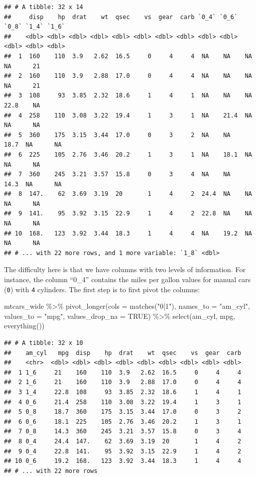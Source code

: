 \documentclass[
]{article}
\newenvironment{Shaded}{\begin{snugshade}}{\end{snugshade}}
\newcommand{\AttributeTok}[1]{\textcolor[rgb]{0.77,0.63,0.00}{#1}}
\newcommand{\ConstantTok}[1]{\textcolor[rgb]{0.00,0.00,0.00}{#1}}
\newcommand{\FunctionTok}[1]{\textcolor[rgb]{0.00,0.00,0.00}{#1}}
\newcommand{\NormalTok}[1]{#1}
\newcommand{\SpecialCharTok}[1]{\textcolor[rgb]{0.00,0.00,0.00}{#1}}
\newcommand{\StringTok}[1]{\textcolor[rgb]{0.31,0.60,0.02}{#1}}
\begin{document}
\begin{verbatim}
## # A tibble: 32 x 14
##     disp    hp  drat    wt  qsec    vs  gear  carb `0_4` `0_6` `0_8` `1_4` `1_6`
##    <dbl> <dbl> <dbl> <dbl> <dbl> <dbl> <dbl> <dbl> <dbl> <dbl> <dbl> <dbl> <dbl>
##  1  160    110  3.9   2.62  16.5     0     4     4  NA    NA    NA    NA      21
##  2  160    110  3.9   2.88  17.0     0     4     4  NA    NA    NA    NA      21
##  3  108     93  3.85  2.32  18.6     1     4     1  NA    NA    NA    22.8    NA
##  4  258    110  3.08  3.22  19.4     1     3     1  NA    21.4  NA    NA      NA
##  5  360    175  3.15  3.44  17.0     0     3     2  NA    NA    18.7  NA      NA
##  6  225    105  2.76  3.46  20.2     1     3     1  NA    18.1  NA    NA      NA
##  7  360    245  3.21  3.57  15.8     0     3     4  NA    NA    14.3  NA      NA
##  8  147.    62  3.69  3.19  20       1     4     2  24.4  NA    NA    NA      NA
##  9  141.    95  3.92  3.15  22.9     1     4     2  22.8  NA    NA    NA      NA
## 10  168.   123  3.92  3.44  18.3     1     4     4  NA    19.2  NA    NA      NA
## # ... with 22 more rows, and 1 more variable: `1_8` <dbl>
\end{verbatim}

The difficulty here is that we have columns with two levels of information. For instance, the
column ``0\_4'' contains the miles per gallon values for manual cars (\texttt{0}) with \texttt{4} cylinders.
The first step is to first pivot the columns:

\begin{Shaded}
\begin{Highlighting}[]
\NormalTok{mtcars\_wide }\SpecialCharTok{\%\textgreater{}\%} 
  \FunctionTok{pivot\_longer}\NormalTok{(}\AttributeTok{cols =} \FunctionTok{matches}\NormalTok{(}\StringTok{"0|1"}\NormalTok{),}
               \AttributeTok{names\_to =} \StringTok{"am\_cyl"}\NormalTok{,}
               \AttributeTok{values\_to =} \StringTok{"mpg"}\NormalTok{,}
               \AttributeTok{values\_drop\_na =} \ConstantTok{TRUE}\NormalTok{) }\SpecialCharTok{\%\textgreater{}\%} 
  \FunctionTok{select}\NormalTok{(am\_cyl, mpg, }\FunctionTok{everything}\NormalTok{())}
\end{Highlighting}
\end{Shaded}

\begin{verbatim}
## # A tibble: 32 x 10
##    am_cyl   mpg  disp    hp  drat    wt  qsec    vs  gear  carb
##    <chr>  <dbl> <dbl> <dbl> <dbl> <dbl> <dbl> <dbl> <dbl> <dbl>
##  1 1_6     21    160    110  3.9   2.62  16.5     0     4     4
##  2 1_6     21    160    110  3.9   2.88  17.0     0     4     4
##  3 1_4     22.8  108     93  3.85  2.32  18.6     1     4     1
##  4 0_6     21.4  258    110  3.08  3.22  19.4     1     3     1
##  5 0_8     18.7  360    175  3.15  3.44  17.0     0     3     2
##  6 0_6     18.1  225    105  2.76  3.46  20.2     1     3     1
##  7 0_8     14.3  360    245  3.21  3.57  15.8     0     3     4
##  8 0_4     24.4  147.    62  3.69  3.19  20       1     4     2
##  9 0_4     22.8  141.    95  3.92  3.15  22.9     1     4     2
## 10 0_6     19.2  168.   123  3.92  3.44  18.3     1     4     4
## # ... with 22 more rows
\end{verbatim}
\end{document}
